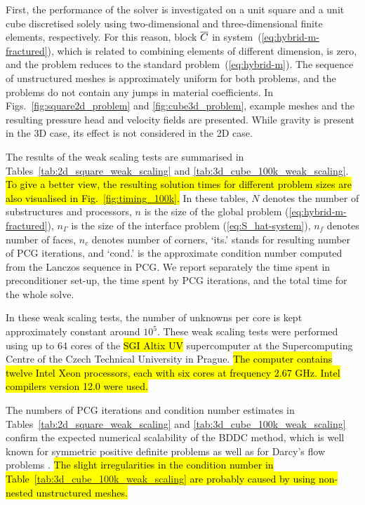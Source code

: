 \label{sec:results_benchmark}

First, the performance of the solver is investigated on a unit square and a
unit cube discretised solely using two-dimensional and three-dimensional
finite elements, respectively. For this reason, block $\overline{C}$ in
system~(\ref{eq:hybrid-m-fractured}), which is related to combining elements
of different dimension, is zero, and the problem reduces to the standard
problem~(\ref{eq:hybrid-m}). The sequence of unstructured meshes is
approximately uniform for both problems, and the problems do not contain any
jumps in material coefficients. 
In Figs.~\ref{fig:square2d_problem} and \ref{fig:cube3d_problem}, example meshes
and the resulting pressure head and velocity fields are presented. While
gravity is present in the 3D case, its effect is not considered in the 2D case.

The results of the weak scaling tests are summarised in
Tables~\ref{tab:2d_square_weak_scaling} and \ref{tab:3d_cube_100k_weak_scaling}.
\hl{To give a better view, the resulting solution times for different problem sizes are also
visualised in Fig.~\ref{fig:timing_100k}.}
In these tables, $N$ denotes the
number of substructures and processors, $n$ is the size of the global problem
(\ref{eq:hybrid-m-fractured}), $n_{\Gamma}$ is the size of the interface
problem (\ref{eq:S_hat-system}), $n_{f}$ denotes number of faces, $n_{c}$
denotes number of corners, `its.' stands for resulting number of PCG
iterations, and `cond.' is the approximate condition number computed from the
Lanczos sequence in PCG. We report separately the time spent in preconditioner
set-up, the time spent by PCG iterations, and the total time for the whole solve.

In these weak scaling tests, the number of unknowns per core is kept
approximately constant around $10^{5}$. 
These weak scaling tests were performed using up to 
64 cores of the \hl{SGI Altix UV} supercomputer at the Supercomputing Centre of the Czech Technical University
in Prague.
\hl{The computer contains twelve Intel Xeon processors, each with six cores at frequency 2.67 GHz.
Intel compilers version 12.0 were used.}

The numbers of PCG iterations and condition number estimates in
Tables~\ref{tab:2d_square_weak_scaling} and
\ref{tab:3d_cube_100k_weak_scaling} confirm the expected numerical scalability
of the BDDC method, which is well known for symmetric positive definite
problems as well as for Darcy's flow problems
\cite{Tu-2007-BAF,Mandel-2003-CBD}.
\hl{The slight irregularities in the condition number in Table~{\ref{tab:3d_cube_100k_weak_scaling}}
are probably caused by using non-nested unstructured meshes.}

